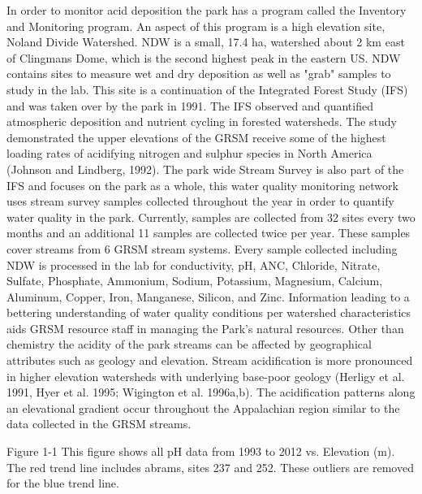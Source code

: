 In order to monitor acid deposition the park has a program called the Inventory and Monitoring program.  An aspect of this program is a high elevation site, Noland Divide Watershed.  NDW is a small, 17.4 ha, watershed about 2 km east of Clingmans Dome, which is the second highest peak in the eastern US.  NDW contains sites to measure wet and dry deposition as well as "grab" samples to study in the lab.  This site is a continuation of the Integrated Forest Study (IFS) and was taken over by the park in 1991.  The IFS observed and quantified atmospheric deposition and nutrient cycling in forested watersheds.  The study demonstrated the upper elevations of the GRSM receive some of the highest loading rates of acidifying nitrogen and sulphur species in North America (Johnson and Lindberg, 1992).   The park wide Stream Survey is also part of the IFS and focuses on the park as a whole, this water quality monitoring network uses stream survey samples collected throughout the year in order to quantify water quality in the park.  Currently, samples are collected from 32 sites every two months and an additional 11 samples are collected twice per year.  These samples cover streams from 6 GRSM stream systems.  Every sample collected including NDW is processed in the lab for conductivity, pH, ANC, Chloride, Nitrate, Sulfate, Phosphate, Ammonium, Sodium, Potassium, Magnesium, Calcium, Aluminum, Copper, Iron, Manganese, Silicon, and Zinc.  Information leading to a bettering understanding of water quality conditions per watershed characteristics aids GRSM resource staff in managing the Park’s natural resources.  Other than chemistry the acidity of the park streams can be affected by geographical attributes such as geology and elevation. Stream acidification is more pronounced in higher elevation watersheds with underlying base-poor geology (Herligy et al. 1991, Hyer et al. 1995; Wigington et al. 1996a,b).  The acidification patterns along an elevational gradient occur throughout the Appalachian region similar to the data collected in the GRSM streams.  

Figure 1-1 
This figure shows all pH data from 1993 to 2012 vs. Elevation (m).  The red trend line includes abrams,  sites 237 and 252.  These outliers are removed for the blue trend line.

